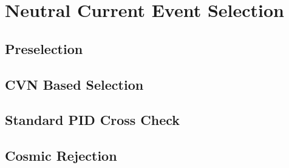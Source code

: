 \chapter{Neutral Current Event Selection}
\label{ch:Selection}

\section{Preselection}

\section{CVN Based Selection}

\section{Standard PID Cross Check}

\section{Cosmic Rejection}